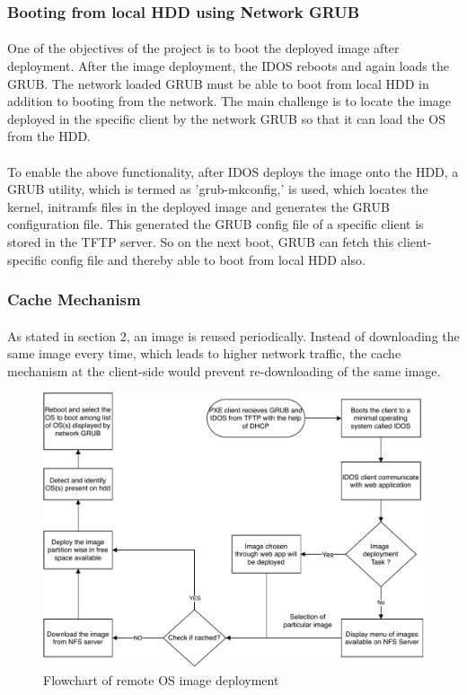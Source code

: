\documentclass[a4paper,12pt]{article}
\begin{document}
\subsubsection{Booting from local HDD using Network GRUB  }
\paragraph{}
One of the objectives of the project is to boot the deployed image after deployment. After the image deployment, the IDOS reboots and again loads the GRUB. The network loaded GRUB must be able to boot from local HDD in addition to booting from the network. The main challenge is to locate the image deployed in the specific client by the network GRUB so that it can load the OS from the HDD.
\paragraph{}
To enable the above functionality, after IDOS deploys the image onto the HDD, a GRUB utility, which is termed as 'grub-mkconfig,' is used, which locates the kernel, initramfs files in the deployed image and generates the GRUB configuration file. This generated the GRUB config file of a specific client is stored in the TFTP server. So on the next boot, GRUB can fetch this client-specific config file and thereby able to boot from local HDD also. 
\subsubsection{Cache Mechanism}
\paragraph{}
As stated in section 2, an image is reused periodically.  Instead of downloading the same image every time, which leads to higher network traffic, the cache mechanism at the client-side would prevent re-downloading of the same image.
\begin{figure}[h!]
    \centering
    \includegraphics[width=\linewidth]{flowchart.pdf}
    \caption{Flowchart of remote OS image deployment }
    \label{fig:detailed design}
\end{figure}
\end{document}
